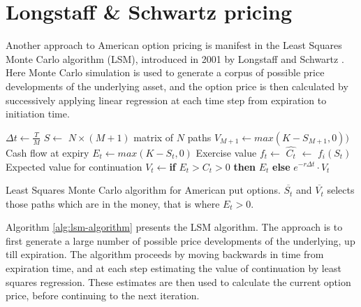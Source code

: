\section{Longstaff \& Schwartz pricing}
Another approach to American option pricing is manifest in the Least
Squares Monte Carlo algorithm (LSM), introduced in 2001 by Longstaff and
Schwartz \cite{longstaff2001valuing}. Here Monte Carlo
simulation is used to generate a corpus of possible price developments
of the underlying asset, and the option price is then calculated by
successively applying linear regression at each time step from
expiration to initiation time.


\begin{algorithm}
  \begin{algorithmic}
    \State $\Delta t \gets \frac{T}{M}$
    \State $S \gets$ 
    \State \Comment $N \times (M+1)$ matrix of $N$ paths
    \State $V_{M+1} \gets max(K-S_{M+1}, 0))$ \Comment Cash flow at expiry
    \State $E_t \gets max(K-S_t, 0)$ \Comment Exercise value
    \State $f_t \gets$  %
    \State $\hat{C_t}$ $\gets$ $f_i(S_t)$ \Comment Expected value for continuation
    \State $V_t \gets $\textbf{if} $E_t > C_t > 0$ \textbf{then} $E_t$ \textbf{else} $e^{-r\Delta t}\cdot V_t$
    \EndFor
    \EndFunction
  \end{algorithmic}
  \vspace{2mm}
  \caption{Least Squares Monte Carlo algorithm for American put
    options. $\overline{S_t}$ and $\overline{V_t}$ selects those paths
    which are in the money, that is where $E_t > 0$.}
  \label{alg:lsm-algorithm}
\end{algorithm}

Algorithm \ref{alg:lsm-algorithm} presents the LSM algorithm.  The
approach is to first generate a large number of possible price
developments of the underlying, up till expiration. The algorithm
proceeds by moving backwards in time from expiration time, and at each
step estimating the value of continuation by least squares
regression. These estimates are then used to calculate the current
option price, before continuing to the next iteration.

